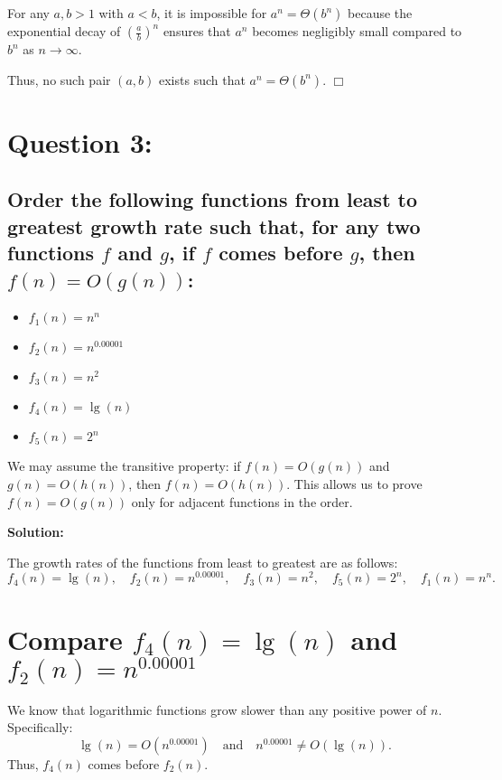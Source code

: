 \documentclass{article}
\begin{document}
For any \( a, b > 1 \) with \( a < b \), it is impossible for \( a^n = \Theta(b^n) \) because the exponential decay of \( \left( \frac{a}{b} \right)^n \) ensures that \( a^n \) becomes negligibly small compared to \( b^n \) as \( n \to \infty \).  

Thus, no such pair \( (a, b) \) exists such that \( a^n = \Theta(b^n) \). \(\Box\)
\pagebreak

\section*{Question 3:}
\subsection*{Order the following functions from least to greatest growth rate such that, for any two functions \( f \) and \( g \), if \( f \) comes before \( g \), then \( f(n) = O(g(n)) \): }

\begin{itemize}
    \item \( f_1(n) = n^n \)
    \item \( f_2(n) = n^{0.00001} \)
    \item \( f_3(n) = n^2 \)
    \item \( f_4(n) = \lg(n) \)
    \item \( f_5(n) = 2^n \)
\end{itemize}

We may assume the transitive property: if \( f(n) = O(g(n)) \) and \( g(n) = O(h(n)) \), then \( f(n) = O(h(n)) \). This allows us to prove \( f(n) = O(g(n)) \) only for adjacent functions in the order.

\textbf{Solution:}  

The growth rates of the functions from least to greatest are as follows:  
\[
f_4(n) = \lg(n), \quad f_2(n) = n^{0.00001}, \quad f_3(n) = n^2, \quad f_5(n) = 2^n, \quad f_1(n) = n^n.
\]

\section*{Compare \( f_4(n) = \lg(n) \) and \( f_2(n) = n^{0.00001} \)}  
We know that logarithmic functions grow slower than any positive power of \( n \). Specifically:
\[
\lg(n) = O(n^{0.00001}) \quad \text{and} \quad n^{0.00001} \neq O(\lg(n)).
\]
Thus, \( f_4(n) \) comes before \( f_2(n) \).
\end{document}
